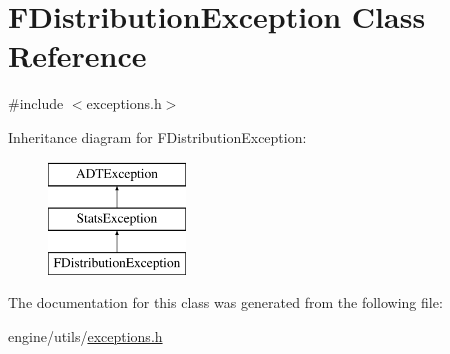 \hypertarget{classFDistributionException}{
\section{FDistributionException Class Reference}
\label{classFDistributionException}
}


{\ttfamily \#include $<$exceptions.h$>$}

Inheritance diagram for FDistributionException:\begin{figure}[H]
\begin{center}
\leavevmode
\includegraphics[height=3cm]{classFDistributionException}
\end{center}
\end{figure}


The documentation for this class was generated from the following file:\begin{DoxyCompactItemize}
\item 
engine/utils/\hyperlink{exceptions_8h}{exceptions.h}\end{DoxyCompactItemize}
